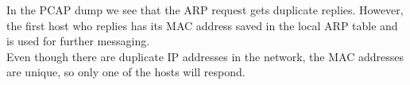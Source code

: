In the PCAP dump we see that the ARP request gets duplicate replies.
However, the first host who replies has its MAC address saved in the local ARP table and is used for further messaging. \\ Even though there are duplicate IP addresses in the network, the MAC addresses are unique, so only one of the hosts will respond.

